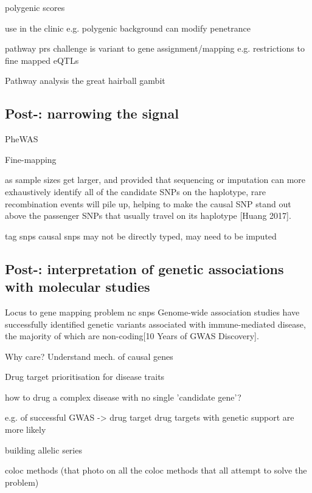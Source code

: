    polygenic scores

        use in the clinic
            e.g. polygenic background can modify penetrance 

    pathway prs
        challenge is variant to gene assignment/mapping
            e.g. restrictions to fine mapped eQTLs

    Pathway analysis
        the great hairball gambit

\subsection{Post-: narrowing the signal}

PheWAS\autocite{verma2017CurrentScopeChallenges}

Fine-mapping

    as sample sizes get larger, and provided that sequencing or imputation can
    more exhaustively identify all of the candidate SNPs on the haplotype, rare
    recombination events will pile up, helping to make the causal SNP stand out
    above the passenger SNPs that usually travel on its haplotype [Huang 2017].

    tag snps
    causal snps may not be directly typed, may need to be imputed

\subsection{Post-: interpretation of genetic associations with molecular studies}

Locus to gene mapping problem
    nc snps
        Genome-wide association studies have successfully identified genetic variants associated with immune-mediated disease, the majority of which are non-coding[10 Years of GWAS Discovery].

Why care?
    Understand mech. of causal genes

    Drug target prioritisation for disease traits

    how to drug a complex disease with no single 'candidate gene'?

        e.g. of successful GWAS -> drug target
            drug targets with genetic support are more likely

        building allelic series

coloc methods
    (that photo on all the coloc methods that all attempt to solve the problem)

